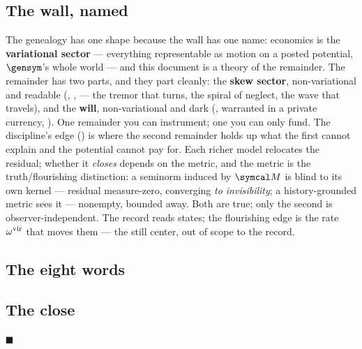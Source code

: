 \documentclass[../main]{subfiles}
\begin{document}

\subsection{The wall, named}
\label{subsec:coda:wall}
%
The genealogy has one shape because the wall has one name: economics is the
\textbf{variational sector} --- everything representable as motion on a posted potential,
$\gensym$'s whole world --- and this document is a theory of the remainder. The remainder
has two parts, and they part cleanly: the \textbf{skew sector}, non-variational and
readable (, ,  --- the tremor that turns,
the spiral of neglect, the wave that travels), and the \textbf{will}, non-variational and
dark (, warranted in a private currency, ). One remainder you
can instrument; one you can only fund. The discipline's edge () is where
the second remainder holds up what the first cannot explain and the potential cannot pay
for. Each richer model relocates the residual; whether it \emph{closes} depends on the
metric, and the metric is the truth/flourishing distinction: a seminorm induced by
$\readout$ is blind to its own kernel --- residual measure-zero, converging \emph{to
invisibility}; a history-grounded metric sees it --- nonempty, bounded away. Both are
true; only the second is observer-independent. The record reads states; the flourishing
edge is the rate $\omega\sp{\mathrm{vir}}$ that moves them --- the still center, out of scope to the
record.


\subsection{The eight words}
\label{subsec:coda:words}
%

\subsection{The close}
\label{subsec:coda:close}

\nobreak\noindent\hfill$\mdlgblksquare$\par
\end{document}
